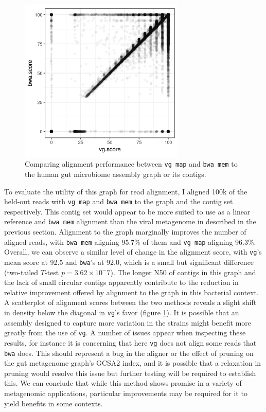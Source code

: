 \begin{figure}[htbp!]
  \centering
  \includegraphics[width=0.7\textwidth]{Chapter3/Figs/human_gut_microbiome_SRS105153_holdout_vg_vs_bwa_scatter.png}
  \caption[Human gut microbiome alignment comparison]{
    Comparing alignment performance between {\tt vg map} and {\tt bwa mem} to the human gut microbiome assembly graph or its contigs.
  }
  \label{fig:human_gut_microbiome_scatter}
\end{figure}

To evaluate the utility of this graph for read alignment, I aligned 100k of the held-out reads with {\tt vg map} and {\tt bwa mem} to the graph and the contig set respectively.
This contig set would appear to be more suited to use as a linear reference and {\tt bwa mem} alignment than the viral metagenome in described in the previous section.
Alignment to the graph marginally improves the number of aligned reads, with {\tt bwa mem} aligning 95.7\% of them and {\tt vg map} aligning 96.3\%.
Overall, we can observe a similar level of change in the alignment score, with {\tt vg}'s mean score at 92.5 and {\tt bwa}'s at 92.0, which is a small but significant difference (two-tailed $T$-test $p=3.62\times 10^-7$).
The longer N50 of contigs in this graph and the lack of small circular contigs apparently contribute to the reduction in relative improvement offered by alignment to the graph in this bacterial context.
A scatterplot of alignment scores between the two methods reveals a slight shift in density below the diagonal in {\tt vg}'s favor (figure \ref{fig:human_gut_microbiome_scatter}).
It is possible that an assembly designed to capture more variation in the strains might benefit more greatly from the use of {\tt vg}.
A number of issues appear when inspecting these results, for instance it is concerning that here {\tt vg} does not align some reads that {\tt bwa} does.
This should represent a bug in the aligner or the effect of pruning on the gut metagenome graph's GCSA2 index, and it is possible that a relaxation in pruning would resolve this issue but further testing will be required to establish this.
We can conclude that while this method shows promise in a variety of metagenomic applications, particular improvements may be required for it to yield benefits in some contexts.


